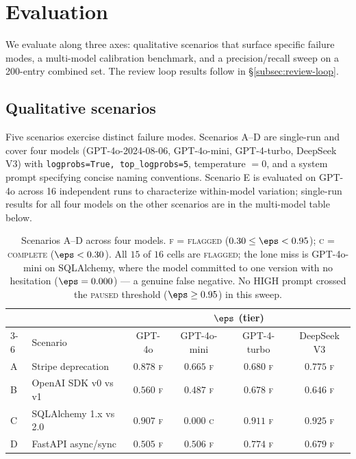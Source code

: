 \section{Evaluation}
\label{sec:evaluation}

We evaluate \eps along three axes: qualitative scenarios that surface
specific failure modes, a multi-model calibration benchmark, and a
precision/recall sweep on a 200-entry combined set. The review loop
results follow in \S\ref{subsec:review-loop}.

\subsection{Qualitative scenarios}
\label{subsec:scenarios}

Five scenarios exercise distinct failure modes. Scenarios A--D are
single-run and cover four models (GPT-4o-2024-08-06, GPT-4o-mini,
GPT-4-turbo, DeepSeek V3) with \texttt{logprobs=True, top\_logprobs=5},
temperature $= 0$, and a system prompt specifying concise naming
conventions. Scenario E is evaluated on GPT-4o across 16 independent
runs to characterize within-model variation; single-run results for all
four models on the other scenarios are in the multi-model table below.

\begin{table}[h]
\centering
\small
\begin{tabular}{llcccc}
\toprule
 & & \multicolumn{4}{c}{$\eps$ (tier)} \\
\cmidrule(lr){3-6}
 & Scenario & GPT-4o & GPT-4o-mini & GPT-4-turbo & DeepSeek V3 \\
\midrule
A & Stripe deprecation        & $0.878$ \textsc{f} & $0.665$ \textsc{f} & $0.680$ \textsc{f} & $0.775$ \textsc{f} \\
B & OpenAI SDK v0 vs v1       & $0.560$ \textsc{f} & $0.487$ \textsc{f} & $0.678$ \textsc{f} & $0.646$ \textsc{f} \\
C & SQLAlchemy 1.x vs 2.0     & $0.907$ \textsc{f} & $\mathbf{0.000}$ \textsc{c} & $0.911$ \textsc{f} & $0.925$ \textsc{f} \\
D & FastAPI async/sync        & $0.505$ \textsc{f} & $0.506$ \textsc{f} & $0.774$ \textsc{f} & $0.679$ \textsc{f} \\
\bottomrule
\end{tabular}
\caption{Scenarios A--D across four models. \textsc{f} = \textsc{%
flagged} ($0.30 \le \eps < 0.95$); \textsc{c} = \textsc{complete}
($\eps < 0.30$). All $15$ of $16$ cells are \textsc{flagged}; the
lone miss is GPT-4o-mini on SQLAlchemy, where the model committed to
one version with no hesitation ($\eps = 0.000$) --- a genuine false
negative. No HIGH prompt crossed the \textsc{paused} threshold
($\eps \ge 0.95$) in this sweep.}
\label{tab:scenarios-multimodel}
\end{table}

